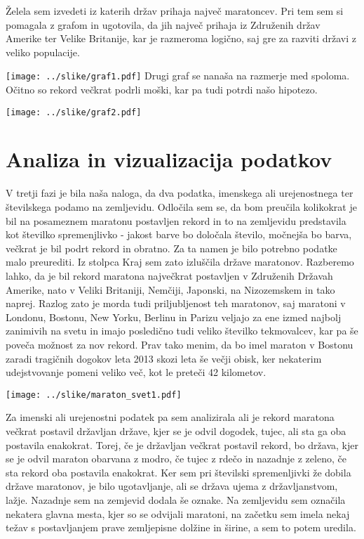 \documentclass[11pt,a4paper]{article}
\begin{document}
Želela sem izvedeti iz katerih držav prihaja največ maratoncev. Pri tem sem si pomagala z grafom in ugotovila, da jih največ prihaja iz Združenih držav Amerike ter Velike Britanije, kar je razmeroma logično, saj gre za razviti državi z veliko populacije. 

\texttt{[image: ../slike/graf1.pdf]}
Drugi graf se nanaša na razmerje med spoloma. Očitno so rekord večkrat podrli moški, kar pa tudi potrdi našo hipotezo. 

\texttt{[image: ../slike/graf2.pdf]}

\section{Analiza in vizualizacija podatkov}

V tretji fazi je bila naša naloga, da dva podatka, imenskega ali urejenostnega ter številskega podamo na zemljevidu. 
Odločila sem se, da bom preučila kolikokrat je bil na posameznem maratonu postavljen rekord in to na zemljevidu predstavila kot številko spremenjlivko - jakost barve bo določala število, močnejša bo barva, večkrat je bil podrt rekord in obratno. Za ta namen je bilo potrebno podatke malo preurediti. Iz stolpca Kraj sem zato izluščila države maratonov. 
Razberemo lahko, da je bil rekord maratona največkrat postavljen v Združenih Državah Amerike, nato v Veliki Britaniji, Nemčiji, Japonski, na Nizozemskem in tako naprej. Razlog zato je morda tudi priljubljenost teh maratonov, saj maratoni v Londonu, Bostonu, New Yorku, Berlinu in Parizu veljajo za ene izmed najbolj zanimivih na svetu in imajo posledično tudi veliko številko tekmovalcev, kar pa še poveča možnost za nov rekord. Prav tako menim, da bo imel maraton v Bostonu zaradi tragičnih dogokov leta 2013 skozi leta še večji obisk, ker nekaterim udejstvovanje pomeni veliko več, kot le preteči 42 kilometov.

\texttt{[image: ../slike/maraton\_svet1.pdf]}

Za imenski ali urejenostni podatek pa sem analizirala ali je rekord maratona večkrat postavil državljan države, kjer se je odvil dogodek, tujec, ali sta ga oba postavila enakokrat. Torej, če je državljan večkrat postavil rekord, bo država, kjer se je odvil maraton obarvana z modro, če tujec z rdečo in nazadnje z zeleno, če sta rekord oba postavila enakokrat.
Ker sem pri številski spremenljivki že dobila države maratonov, je bilo ugotavljanje, ali se država ujema z državljanstvom, lažje.
Nazadnje sem na zemjevid dodala še oznake. Na zemljevidu sem označila nekatera glavna mesta, kjer so se odvijali maratoni, na začetku sem imela nekaj težav s postavljanjem prave zemljepisne dolžine in širine, a sem to potem uredila.
\end{document}
